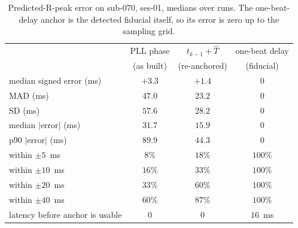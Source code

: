 \begin{table}[t]
\centering
\small
\caption{Predicted-R-peak error on sub-070, ses-01, medians over runs. The
one-beat-delay anchor is the detected fiducial itself, so its error is zero up to the
sampling grid.}
\label{tab:rpeak}
\begin{tabular}{@{}lccc@{}}
\toprule
 & PLL phase & $t_{k-1}+\hat{T}$ & one-beat delay \\
 & (as built) & (re-anchored) & (fiducial) \\
\midrule
median signed error (ms) & $+3.3$ & $+1.4$ & $0$ \\
MAD (ms) & $47.0$ & $23.2$ & $0$ \\
SD (ms) & $57.6$ & $28.2$ & $0$ \\
median $|$error$|$ (ms) & $31.7$ & $15.9$ & $0$ \\
p90 $|$error$|$ (ms) & $89.9$ & $44.3$ & $0$ \\
within $\pm5$~ms & $8\%$ & $18\%$ & $100\%$ \\
within $\pm10$~ms & $16\%$ & $33\%$ & $100\%$ \\
within $\pm20$~ms & $33\%$ & $60\%$ & $100\%$ \\
within $\pm40$~ms & $60\%$ & $87\%$ & $100\%$ \\
\midrule
latency before anchor is usable & $0$ & $0$ & $16$~ms \\
\bottomrule
\end{tabular}
\end{table}
